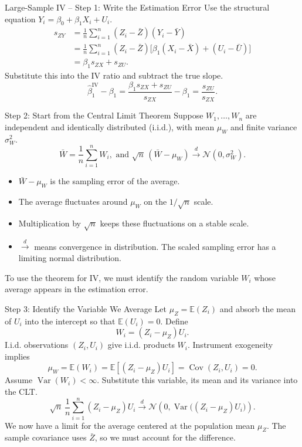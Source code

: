 \documentclass[notes,10pt, aspectratio=169]{beamer}
\begin{document}
\begin{frame}{Large-Sample IV\texorpdfstring{ -- }{ - }Step 1: Write the Estimation Error}
Use the structural equation $Y_i=\beta_0+\beta_1X_i+U_i$.
\[
\begin{aligned}
s_{ZY}
&=\frac{1}{n}\sum_{i=1}^{n}(Z_i-\bar Z)(Y_i-\bar Y)\\
&=\frac{1}{n}\sum_{i=1}^{n}(Z_i-\bar Z)
  \bigl[\beta_1(X_i-\bar X)+(U_i-\bar U)\bigr]\\
&=\beta_1s_{ZX}+s_{ZU}.
\end{aligned}
\]
Substitute this into the IV ratio and subtract the true slope.
\[
\hat\beta_1^{\mathrm{IV}}-\beta_1
=\frac{\beta_1s_{ZX}+s_{ZU}}{s_{ZX}}-\beta_1
=\frac{s_{ZU}}{s_{ZX}}.
\]
\end{frame}

\begin{frame}{Step 2: Start from the Central Limit Theorem}
Suppose $W_1,\ldots,W_n$ are independent and identically distributed (i.i.d.), with mean $\mu_W$ and finite variance $\sigma_W^2$.
\[
\bar W=\frac{1}{n}\sum_{i=1}^{n}W_i,\text{ and }
\sqrt n\,(\bar W-\mu_W)
\xrightarrow{d}\mathcal N(0,\sigma_W^2).
\]
\begin{itemize}
    \item $\bar W-\mu_W$ is the sampling error of the average.
    \item The average fluctuates around $\mu_W$ on the $1/\sqrt n$ scale.
    \item Multiplication by $\sqrt n$ keeps these fluctuations on a stable scale.
    \item $\xrightarrow{d}$ means convergence in distribution. The scaled sampling error has a limiting normal distribution.
\end{itemize}
\medskip
To use the theorem for IV, we must identify the random variable $W_i$ whose average appears in the estimation error.
\end{frame}

\begin{frame}{Step 3: Identify the Variable We Average}
Let $\mu_Z=\mathbb E(Z_i)$ and absorb the mean of $U_i$ into the intercept so that $\mathbb E(U_i)=0$. Define
\[
W_i=(Z_i-\mu_Z)U_i.
\]
I.i.d. observations $(Z_i,U_i)$ give i.i.d. products $W_i$. Instrument exogeneity implies
\[
\mu_W=\mathbb E(W_i)
=\mathbb E[(Z_i-\mu_Z)U_i]
=\operatorname{Cov}(Z_i,U_i)=0.
\]
Assume $\operatorname{Var}(W_i)<\infty$. Substitute this variable, its mean and its variance into the CLT.
\[
\sqrt n\,\frac{1}{n}\sum_{i=1}^{n}(Z_i-\mu_Z)U_i
\xrightarrow{d}
\mathcal N\!\left(0,\operatorname{Var}\bigl((Z_i-\mu_Z)U_i\bigr)\right).
\]
We now have a limit for the average centered at the population mean $\mu_Z$. The sample covariance uses $\bar Z$, so we must account for the difference.
\end{frame}
\end{document}
